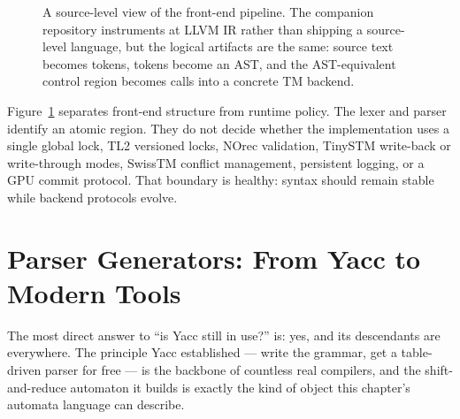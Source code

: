 \begin{figure}[htbp]
\centering
{}
\caption{A source-level view of the front-end pipeline. The companion repository instruments at LLVM IR rather than shipping a source-level language, but the logical artifacts are the same: source text becomes tokens, tokens become an AST, and the AST-equivalent control region becomes calls into a concrete TM backend.}
\label{fig:front-end-pipeline}
\end{figure}

Figure~\ref{fig:front-end-pipeline} separates front-end structure from runtime policy. The lexer and parser identify an atomic region. They do not decide whether the implementation uses a single global lock, TL2 versioned locks, NOrec validation, TinySTM write-back or write-through modes, SwissTM conflict management, persistent logging, or a GPU commit protocol. That boundary is healthy: syntax should remain stable while backend protocols evolve.

\section{Parser Generators: From Yacc to Modern Tools}

The most direct answer to ``is Yacc still in use?'' is: yes, and its descendants
are everywhere.  The principle Yacc established --- write the grammar, get a
table-driven parser for free --- is the backbone of countless real compilers,
and the shift-and-reduce automaton it builds is exactly the kind of object
this chapter's automata language can describe.

